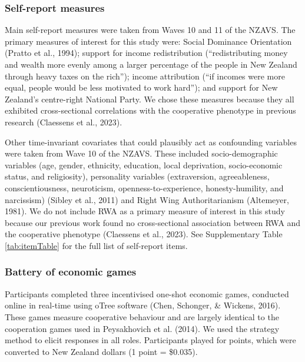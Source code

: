 \documentclass[
  man,floatsintext]{apa6}
\begin{document}
\hypertarget{self-report-measures}{%
\subsubsection{Self-report measures}\label{self-report-measures}}

Main self-report measures were taken from Waves 10 and 11 of the NZAVS. The
primary measures of interest for this study were: Social Dominance Orientation
(Pratto et al., 1994); support for income redistribution (``redistributing money and
wealth more evenly among a larger percentage of the people in New Zealand
through heavy taxes on the rich''); income attribution (``if incomes were more
equal, people would be less motivated to work hard''); and support for New
Zealand's centre-right National Party. We chose these measures because they all
exhibited cross-sectional correlations with the cooperative phenotype in
previous research (Claessens et al., 2023).

Other time-invariant covariates that could plausibly act as confounding
variables were taken from Wave 10 of the NZAVS. These included socio-demographic
variables (age, gender, ethnicity, education, local deprivation, socio-economic
status, and religiosity), personality variables (extraversion, agreeableness,
conscientiousness, neuroticism, openness-to-experience, honesty-humility, and
narcissism) (Sibley et al., 2011) and Right Wing Authoritarianism (Altemeyer, 1981). We
do not include RWA as a primary measure of interest in this study because our
previous work found no cross-sectional association between RWA and the
cooperative phenotype (Claessens et al., 2023). See Supplementary Table
\ref{tab:itemTable} for the full list of self-report items.

\hypertarget{battery-of-economic-games}{%
\subsubsection{Battery of economic games}\label{battery-of-economic-games}}

Participants completed three incentivised one-shot economic games, conducted
online in real-time using oTree software (Chen, Schonger, \& Wickens, 2016). These games measure
cooperative behaviour and are largely identical to the cooperation games used in
Peysakhovich et al. (2014). We used the strategy method to elicit responses in all roles.
Participants played for points, which were converted to New Zealand dollars
(1 point = \$0.035).
\end{document}
